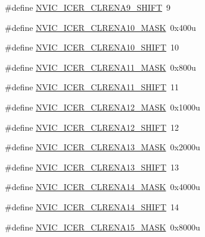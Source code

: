 \begin{DoxyCompactItemize}
\item 
\#define \hyperlink{group___n_v_i_c___register___masks_ga2ab79983efe4303a13b7ce89207519b6}{N\+V\+I\+C\+\_\+\+I\+C\+E\+R\+\_\+\+C\+L\+R\+E\+N\+A9\+\_\+\+S\+H\+I\+FT}~9
\item 
\#define \hyperlink{group___n_v_i_c___register___masks_gae61c4a834b4db8ab585c20b1254bc583}{N\+V\+I\+C\+\_\+\+I\+C\+E\+R\+\_\+\+C\+L\+R\+E\+N\+A10\+\_\+\+M\+A\+SK}~0x400u
\item 
\#define \hyperlink{group___n_v_i_c___register___masks_gac9c82ba82086ff10110b26d0234bda87}{N\+V\+I\+C\+\_\+\+I\+C\+E\+R\+\_\+\+C\+L\+R\+E\+N\+A10\+\_\+\+S\+H\+I\+FT}~10
\item 
\#define \hyperlink{group___n_v_i_c___register___masks_ga273a56e63324af9dbdbeb996d5a33335}{N\+V\+I\+C\+\_\+\+I\+C\+E\+R\+\_\+\+C\+L\+R\+E\+N\+A11\+\_\+\+M\+A\+SK}~0x800u
\item 
\#define \hyperlink{group___n_v_i_c___register___masks_ga5b69894c49bee9da63b2a654bfd3e5c8}{N\+V\+I\+C\+\_\+\+I\+C\+E\+R\+\_\+\+C\+L\+R\+E\+N\+A11\+\_\+\+S\+H\+I\+FT}~11
\item 
\#define \hyperlink{group___n_v_i_c___register___masks_gaf9c397e27f15873bf2335e77bd24332e}{N\+V\+I\+C\+\_\+\+I\+C\+E\+R\+\_\+\+C\+L\+R\+E\+N\+A12\+\_\+\+M\+A\+SK}~0x1000u
\item 
\#define \hyperlink{group___n_v_i_c___register___masks_ga79532ada0cef1992e5f9ca6cf62092ee}{N\+V\+I\+C\+\_\+\+I\+C\+E\+R\+\_\+\+C\+L\+R\+E\+N\+A12\+\_\+\+S\+H\+I\+FT}~12
\item 
\#define \hyperlink{group___n_v_i_c___register___masks_gaf82bf71ac99156a96417b6255314bda4}{N\+V\+I\+C\+\_\+\+I\+C\+E\+R\+\_\+\+C\+L\+R\+E\+N\+A13\+\_\+\+M\+A\+SK}~0x2000u
\item 
\#define \hyperlink{group___n_v_i_c___register___masks_ga07471f1404ed0c42298b9ae67250b82b}{N\+V\+I\+C\+\_\+\+I\+C\+E\+R\+\_\+\+C\+L\+R\+E\+N\+A13\+\_\+\+S\+H\+I\+FT}~13
\item 
\#define \hyperlink{group___n_v_i_c___register___masks_ga0484cb1c29bdc9d3b06d63d0a0c093a5}{N\+V\+I\+C\+\_\+\+I\+C\+E\+R\+\_\+\+C\+L\+R\+E\+N\+A14\+\_\+\+M\+A\+SK}~0x4000u
\item 
\#define \hyperlink{group___n_v_i_c___register___masks_ga61d47d4b69bc979ee9f4b3a1dbe9aa02}{N\+V\+I\+C\+\_\+\+I\+C\+E\+R\+\_\+\+C\+L\+R\+E\+N\+A14\+\_\+\+S\+H\+I\+FT}~14
\item 
\#define \hyperlink{group___n_v_i_c___register___masks_ga73c9a1d71120aa74adec64e5a30449ae}{N\+V\+I\+C\+\_\+\+I\+C\+E\+R\+\_\+\+C\+L\+R\+E\+N\+A15\+\_\+\+M\+A\+SK}~0x8000u

\end{DoxyCompactItemize}
